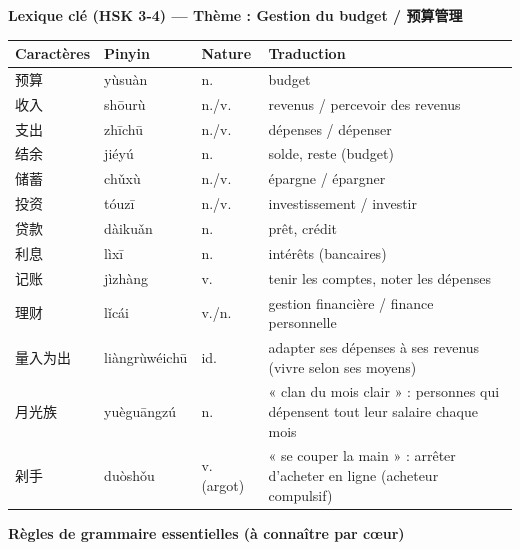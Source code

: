 \documentclass[11pt]{article}
\begin{document}
\begin{bilan}
\textbf{Lexique clé (HSK 3-4) — Thème : Gestion du budget / 预算管理}

\begin{center}
\begin{tabularx}{\linewidth}{|X|X|X|X|}
\hline
\rowcolor{popblueL} \textbf{Caractères} & \textbf{Pinyin} & \textbf{Nature} & \textbf{Traduction} \\ \hline
预算 & yùsuàn & n. & budget \\ \hline
收入 & shōurù & n./v. & revenus / percevoir des revenus \\ \hline
支出 & zhīchū & n./v. & dépenses / dépenser \\ \hline
结余 & jiéyú & n. & solde, reste (budget) \\ \hline
储蓄 & chǔxù & n./v. & épargne / épargner \\ \hline
投资 & tóuzī & n./v. & investissement / investir \\ \hline
贷款 & dàikuǎn & n. & prêt, crédit \\ \hline
利息 & lìxī & n. & intérêts (bancaires) \\ \hline
记账 & jìzhàng & v. & tenir les comptes, noter les dépenses \\ \hline
理财 & lǐcái & v./n. & gestion financière / finance personnelle \\ \hline
量入为出 & liàngrùwéichū & id. & adapter ses dépenses à ses revenus (vivre selon ses moyens) \\ \hline
月光族 & yuèguāngzú & n. & « clan du mois clair » : personnes qui dépensent tout leur salaire chaque mois \\ \hline
剁手 & duòshǒu & v. (argot) & « se couper la main » : arrêter d'acheter en ligne (acheteur compulsif) \\ \hline
\end{tabularx}
\end{center}

\textbf{Règles de grammaire essentielles (à connaître par cœur)}


\end{bilan}
\end{document}
